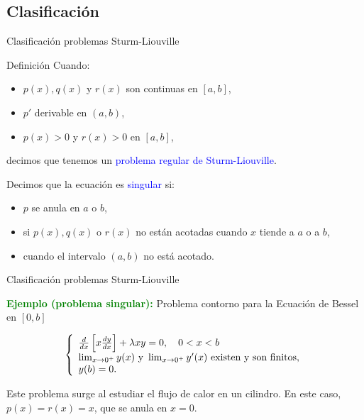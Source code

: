 \documentclass[xcolor=dvipsnames,a4paper,10pt,handout]{beamer}
\renewcommand{\emph}[1]{\textcolor{blue}{#1}}
\renewcommand{\textbf}[1]{\textcolor{green}{\bfseries #1}}
\begin{document}
\subsection{Clasificación}
\begin{frame}{Clasificación problemas Sturm-Liouville}
\begin{block}{Definición}
 Cuando:
 \begin{itemize}
  \item  $p(x), q(x)$ y $r(x)$ son continuas en $[a, b]$, 
  \item $p'$ derivable en $(a,b)$,
  \item $p(x)>0$ y $r(x)>0$ en $[a, b]$, 
 \end{itemize}
decimos que tenemos un  \emph{ problema regular de Sturm-Liouville}.
\onslide<+->

Decimos que la ecuación es \emph{singular} si:
 \begin{itemize}
  \item $p$ se anula en $a$ o  $ b$,
  \item si $p(x), q(x)$ o $r(x)$ no están acotadas cuando $x$ tiende a $a$ o a $b$,
  \item cuando el intervalo $(a, b)$ no está acotado. 
 \end{itemize}



  
\end{block}


 \end{frame}
 

\begin{frame}{Clasificación problemas Sturm-Liouville}


\textbf{Ejemplo (problema singular):} Problema contorno para la Ecuación de Bessel en $[0,b]$

\[
 \left\{
        \begin{array}{l}
         \frac{d}{d x}\left[x \frac{d y}{d x}\right]+\lambda x y=0, \quad 0<x<b\\
         \lim _{x \rightarrow 0^{+}} y(x)\hbox{ y }\lim _{x \rightarrow 0^{+}} y^{\prime}(x) \hbox{ existen y son finitos},\\ 
         y(b)=0 .\\         
        \end{array}
 \right.
\]

Este problema surge al estudiar el flujo de calor en un cilindro. En este caso, $p(x)=r(x)=x$, que se anula en $x=0$. 

 \end{frame}
\end{document}
